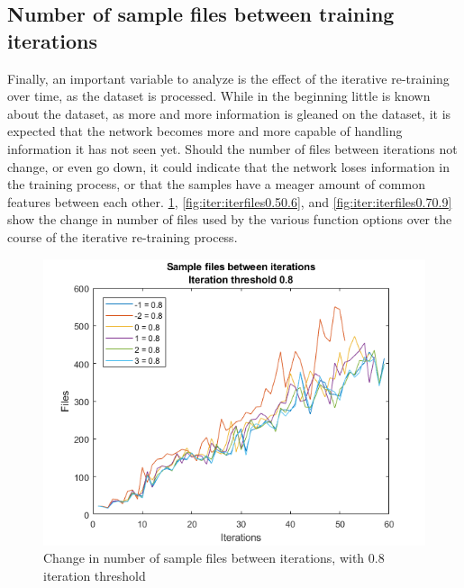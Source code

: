 \subsection{Number of sample files between training iterations}
Finally, an important variable to analyze is the effect of the iterative re-training over time, as the dataset is processed.
While in the beginning little is known about the dataset, as more and more information is gleaned on the dataset, it is expected that the network becomes more and more capable of handling information it has not seen yet.
Should the number of files between iterations not change, or even go down, it could indicate that the network loses information in the training process, or that the samples have a meager amount of common features between each other.
\cref{fig:iter:iterfiles0.8}, \cref{fig:iter:iterfiles0.50.6}, and \cref{fig:iter:iterfiles0.70.9} show the change in number of files used by the various function options over the course of the iterative re-training process.

\begin{figure}  %
  \centering
  \includegraphics[width=.7\textwidth]{figures/iterfiles-0.8.png}
  \caption{Change in number of sample files between iterations, with 0.8 iteration threshold}
  \label{fig:iter:iterfiles0.8}
\end{figure}

